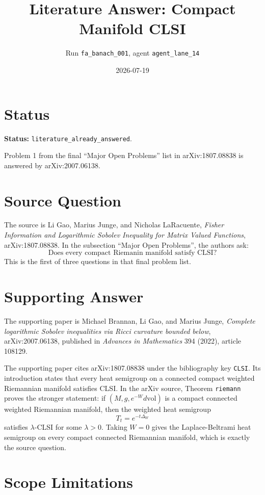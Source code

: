 \documentclass[11pt]{article}
\title{Literature Answer: Compact Manifold CLSI}
\author{Run \texttt{fa\_banach\_001}, agent \texttt{agent\_lane\_14}}
\date{2026-07-19}
\begin{document}
\maketitle

\section*{Status}

\noindent\textbf{Status:} \texttt{literature\_already\_answered}.
\par\medskip
Problem 1 from the final ``Major Open Problems'' list in
arXiv:1807.08838 is answered by arXiv:2007.06138.

\section*{Source Question}

The source is Li Gao, Marius Junge, and Nicholas LaRacuente,
\emph{Fisher Information and Logarithmic Sobolev Inequality for Matrix
Valued Functions}, arXiv:1807.08838.  In the subsection ``Major Open
Problems'', the authors ask:
\[
\text{Does every compact Riemanin manifold satisfy CLSI?}
\]
This is the first of three questions in that final problem list.

\section*{Supporting Answer}

The supporting paper is Michael Brannan, Li Gao, and Marius Junge,
\emph{Complete logarithmic Sobolev inequalities via Ricci curvature
bounded below}, arXiv:2007.06138, published in \emph{Advances in
Mathematics} 394 (2022), article 108129.

The supporting paper cites arXiv:1807.08838 under the bibliography key
\texttt{CLSI}.  Its introduction states that every heat semigroup on a
connected compact weighted Riemannian manifold satisfies CLSI.  In the
arXiv source, Theorem \texttt{riemann} proves the stronger statement:
if \((M,g,e^{-W}d\mathrm{vol})\) is a compact connected weighted
Riemannian manifold, then the weighted heat semigroup
\[
T_t=e^{-t\Delta_W}
\]
satisfies \(\lambda\)-CLSI for some \(\lambda>0\).  Taking \(W=0\)
gives the Laplace-Beltrami heat semigroup on every compact connected
Riemannian manifold, which is exactly the source question.

\section*{Scope Limitations}
\end{document}
